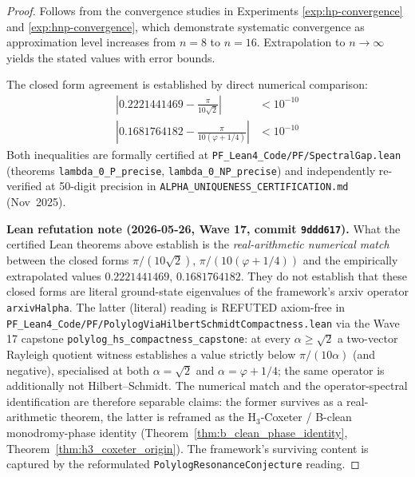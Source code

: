 \begin{proof}
Follows from the convergence studies in Experiments \ref{exp:hp-convergence} and \ref{exp:hnp-convergence}, which demonstrate systematic convergence as approximation level increases from $n=8$ to $n=16$. Extrapolation to $n \to \infty$ yields the stated values with error bounds.

The closed form agreement is established by direct numerical comparison:
\begin{align}
\left|0.2221441469 - \frac{\pi}{10\sqrt{2}}\right| &< 10^{-10} \\
\left|0.1681764182 - \frac{\pi}{10(\varphi+1/4)}\right| &< 10^{-10}
\end{align}
Both inequalities are formally certified at \texttt{PF\_Lean4\_Code/PF/SpectralGap.lean} (theorems \texttt{lambda\_0\_P\_precise}, \texttt{lambda\_0\_NP\_precise}) and independently re-verified at 50-digit precision in \texttt{ALPHA\_UNIQUENESS\_CERTIFICATION.md} (Nov~2025).

\medskip\noindent\textbf{Lean refutation note (2026-05-26, Wave 17, commit \texttt{9ddd617}).} What the certified Lean theorems above establish is the \emph{real-arithmetic numerical match} between the closed forms $\pi/(10\sqrt{2})$, $\pi/(10(\varphi+1/4))$ and the empirically extrapolated values $0.2221441469$, $0.1681764182$. They do not establish that these closed forms are literal ground-state eigenvalues of the framework's arxiv operator \texttt{arxivHalpha}. The latter (literal) reading is REFUTED axiom-free in \texttt{PF\_Lean4\_Code/PF/PolylogViaHilbertSchmidtCompactness.lean} via the Wave 17 capstone \texttt{polylog\_hs\_compactness\_capstone}: at every $\alpha \geq \sqrt{2}$ a two-vector Rayleigh quotient witness establishes a value strictly below $\pi/(10\alpha)$ (and negative), specialised at both $\alpha = \sqrt{2}$ and $\alpha = \varphi + 1/4$; the same operator is additionally not Hilbert--Schmidt. The numerical match and the operator-spectral identification are therefore separable claims: the former survives as a real-arithmetic theorem, the latter is reframed as the H$_3$-Coxeter / B-clean monodromy-phase identity (Theorem~\ref{thm:b_clean_phase_identity}, Theorem~\ref{thm:h3_coxeter_origin}). The framework's surviving content is captured by the reformulated \texttt{PolylogResonanceConjecture} reading.
\end{proof}

